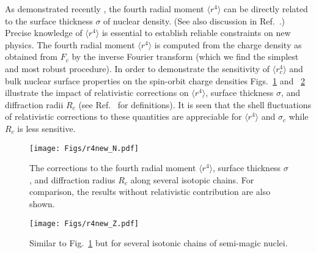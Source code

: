 \documentclass[aps,prc,twocolumn,floatfix,nofootinbib,preprintnumbers,superscriptaddress,longbibliography]{revtex4-1}
\newcommand{\rf}{\langle r^4\rangle}
\begin{document}
As demonstrated recently  \cite{Reinhard2020},
the fourth radial moment $\rf$ can be directly related to the surface
thickness $\sigma$ of nuclear density. (See also discussion in Ref.~\cite{Kurasawa2019}.) Precise knowledge of $\rf$ is essential to establish reliable
constraints on new physics.
 The fourth radial moment $\rf$ is computed from the charge density as obtained from $F_c$ by the inverse Fourier  transform (which we find the simplest and most robust procedure).
In order to demonstrate the sensitivity of $\langle r^4_c\rangle$  and bulk nuclear surface properties on the spin-orbit charge densities
Figs.~\ref{fig:r4N} and ~\ref{fig:r4Z} illustrate the impact of relativistic corrections  on $\rf$, surface thickness $\sigma$, and diffraction radii $R_c$ (see Ref.~\cite{Reinhard2020} for definitions).
It is seen that the shell fluctuations of relativistic corrections to these quantities are appreciable for $\rf$ and $\sigma_c$ while $R_c$ is less sensitive.

\begin{figure}[htb]
\texttt{[image: Figs/r4new\_N.pdf]}
\caption{The corrections to the
fourth radial  moment  $\rf$, surface thickness $\sigma$, and diffraction radius $R_c$ along several isotopic chains. For comparison, the results without relativistic contribution are also  shown.}
\label{fig:r4N}
\end{figure}


\begin{figure}[htb]
\texttt{[image: Figs/r4new\_Z.pdf]}
\caption{Similar to Fig.~\ref{fig:r4N} but for
several  isotonic chains of semi-magic nuclei.}
\label{fig:r4Z}
\end{figure}




\end{document}
